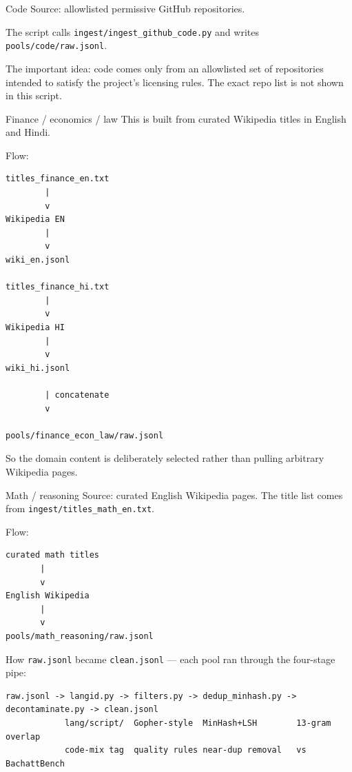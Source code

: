 \begin{paragraphblock}{Code}
  Source: allowlisted permissive GitHub repositories.

  The script calls \texttt{ingest/ingest\_github\_code.py} and writes
  \texttt{pools/code/raw.jsonl}.

  The important idea: code comes only from an allowlisted set of
  repositories intended to satisfy the project's licensing rules. The
  exact repo list is not shown in this script.
\end{paragraphblock}

\begin{paragraphblock}{Finance / economics / law}
  This is built from curated Wikipedia titles in English and Hindi.

  Flow:
\begin{lstlisting}[style=shadedpython,language={},basicstyle=\scriptsize\ttfamily]
titles_finance_en.txt
        |
        v
Wikipedia EN
        |
        v
wiki_en.jsonl

titles_finance_hi.txt
        |
        v
Wikipedia HI
        |
        v
wiki_hi.jsonl

        | concatenate
        v

pools/finance_econ_law/raw.jsonl
\end{lstlisting}
  So the domain content is deliberately selected rather than pulling
  arbitrary Wikipedia pages.
\end{paragraphblock}

\begin{paragraphblock}{Math / reasoning}
  Source: curated English Wikipedia pages. The title list comes from
  \texttt{ingest/titles\_math\_en.txt}.

  Flow:
\begin{lstlisting}[style=shadedpython,language={},basicstyle=\scriptsize\ttfamily]
curated math titles
       |
       v
English Wikipedia
       |
       v
pools/math_reasoning/raw.jsonl
\end{lstlisting}
\end{paragraphblock}

How \texttt{raw.jsonl} became \texttt{clean.jsonl} --- each pool ran
through the four-stage pipe:
\begin{lstlisting}[style=shadedpython,language={},basicstyle=\scriptsize\ttfamily,breaklines=true]
raw.jsonl -> langid.py -> filters.py -> dedup_minhash.py -> decontaminate.py -> clean.jsonl
            lang/script/  Gopher-style  MinHash+LSH        13-gram overlap
            code-mix tag  quality rules near-dup removal   vs BachattBench
\end{lstlisting}

